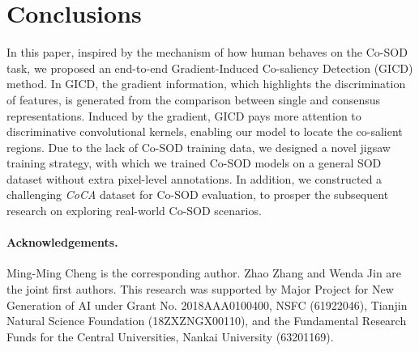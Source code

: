 \documentclass[runningheads,orivec]{llncs}
\begin{document}
\section{Conclusions}
In this paper, inspired by the mechanism of how human behaves on the Co-SOD task, we proposed an end-to-end Gradient-Induced Co-saliency Detection (GICD) method.
In GICD, the gradient information, which highlights the discrimination of features, is generated from the comparison between single and consensus representations.
Induced by the gradient, GICD pays more attention to discriminative convolutional kernels, enabling our model to locate the co-salient regions.
Due to the lack of Co-SOD training data, we designed a novel jigsaw training strategy, with which we trained Co-SOD models on a general SOD dataset without extra pixel-level annotations.
In addition, we constructed a challenging \textit{CoCA} dataset for Co-SOD evaluation, to prosper the subsequent research on exploring real-world Co-SOD scenarios.


\paragraph{\textbf{Acknowledgements.}}
Ming-Ming Cheng is the corresponding author.
Zhao Zhang and Wenda Jin are the joint first authors.
This research was supported by Major Project for New
Generation of AI under Grant No. 2018AAA0100400,
NSFC (61922046), Tianjin Natural Science Foundation (18ZXZNGX00110),
and the Fundamental Research Funds for the Central Universities,
Nankai University (63201169).




\end{document}

